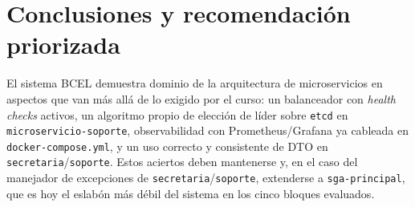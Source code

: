 \documentclass[11pt,a4paper]{article}
\begin{document}
    \section{Conclusiones y recomendaci\'on priorizada}
    \label{sec:conclusiones}

    El sistema BCEL demuestra dominio de la arquitectura de microservicios en aspectos que van m\'as all\'a de lo exigido por el curso: un balanceador con \emph{health checks} activos, un algoritmo propio de elecci\'on de l\'ider sobre \texttt{etcd} en \texttt{microservicio-soporte}, observabilidad con Prometheus/Grafana ya cableada en \texttt{docker-compose.yml}, y un uso correcto y consistente de DTO en \texttt{secretaria}/\texttt{soporte}. Estos aciertos deben mantenerse y, en el caso del manejador de excepciones de \texttt{secretaria}/\texttt{soporte}, extenderse a \texttt{sga-principal}, que es hoy el eslab\'on m\'as d\'ebil del sistema en los cinco bloques evaluados.
\end{document}
